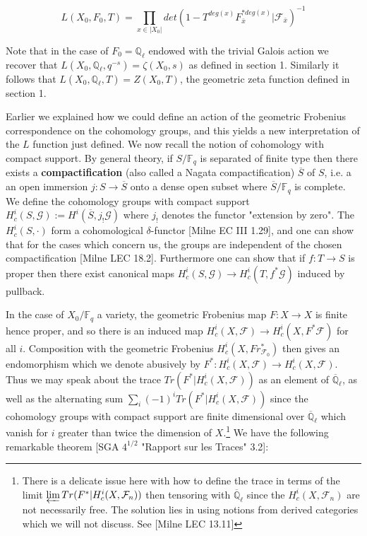 \documentclass{ucbthesis}
\theoremstyle{definition}
\theoremstyle{theorem}
\begin{document}
$$L(X_{0},F_{0},T) = \prod\limits_{x\in|X_{0}|}det(1-T^{deg(x)}F^{*deg(x)}_{\bar{x}}|\mathcal{F}_{\bar{x}})^{-1}$$

Note that in the case of $F_{0} = \mathbb{Q}_{\ell}$ endowed with the trivial Galois action we recover that $L(X_{0},\mathbb{Q}_{\ell},q^{-s}) = \zeta(X_{0},s)$ as defined in section 1. Similarly it follows that $L(X_{0},\mathbb{Q}_{\ell},T) = Z(X_{0},T)$, the geometric zeta function defined in section 1. 

Earlier we explained how we could define an action of the geometric Frobenius correspondence  on the cohomology groups, and this yields a new interpretation of the $L$ function just defined.
We now recall the notion of cohomology with compact support. By general theory, if $S/\mathbb{F}_{q}$ is separated of finite type then there exists a \textbf{compactification} (also called a Nagata compactification) $\overline{S}$ of $S$, i.e. a an open immersion $j:S \rightarrow \overline{S}$ onto a dense open subset where $\overline{S}/\mathbb{F}_{q}$ is complete. We define the cohomology groups with compact support $H^{i}_{c}(S,\mathcal{G}) := H^{i}(\overline{S},j_{!}\mathcal{G})$ where $j_{!}$ denotes the functor "extension by zero". The $H^{i}_{c}(S,\cdot)$ form a cohomological $\delta$-functor [Milne EC III 1.29], and one can show that for the cases which concern us, the groups are independent of the chosen compactification [Milne LEC 18.2]. Furthermore one can show that if $f:T\rightarrow S$ is proper then there exist canonical maps $H^{i}_{c}(S,\mathcal{G}) \rightarrow H^{i}_{c}(T,f^{*}\mathcal{G})$ induced by pullback. 

In the case of $X_{0}/\mathbb{F}_{q}$ a variety, the geometric Frobenius map $F:X \rightarrow X$ is finite hence proper, and so there is an induced map $H^{i}_{c}(X,\mathcal{F}) \rightarrow H^{i}_{c}(X,F^{*}\mathcal{F})$ for all $i$. Composition with the geometric Frobenius $H^{i}_{c}(X,Fr^{*}_{\mathcal{F}_{0}})$ then gives an endomorphism which we denote abusively by $F^{*}:H^{i}_{c}(X,\mathcal{F}) \rightarrow  H^{i}_{c}(X,\mathcal{F})$. Thus we may speak about the trace $Tr(F^{*}|H^{i}_{c}(X,\mathcal{F}))$ as an element of $\overline{\mathbb{Q}}_\ell$, as well as the alternating sum $\sum\limits_{i}(-1)^{i}Tr(F^{*}|H^{i}_{c}(X,\mathcal{F}))$ since the cohomology groups with compact support are finite dimensional over $\overline{\mathbb{Q}}_\ell$ which vanish for $i$ greater than twice the dimension of $X$.\footnote{There is a delicate issue here with how to define the trace in terms of the limit $\varprojlim Tr(F^{*}|H^{i}_{c}(X,\mathcal{F}_{n}))$ then tensoring with $\overline{\mathbb{Q}}_\ell$ since the $H^{i}_{c}(X,\mathcal{F}_{n})$ are not necessarily free. The solution lies in using notions from derived categories which we will not discuss. See [Milne LEC 13.11]}
We have the following remarkable theorem [SGA $4^{1/2}$ "Rapport sur les Traces" 3.2]:
\end{document}
